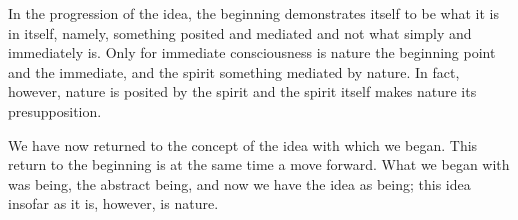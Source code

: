 In the progression of the idea, the beginning demonstrates itself to be
what it is in itself, namely,
something posited and mediated and not what simply and immediately is.
Only for immediate consciousness is nature the beginning point and the immediate,
and the spirit something mediated by nature.
In fact, however, nature is posited by the spirit and
the spirit itself makes nature its presupposition.

We have now returned to the concept of the idea with which we began.
This return to the beginning is at the same time a move forward.
What we began with was being, the abstract being,
and now we have the idea as being;
this idea insofar as it is, however, is nature.
